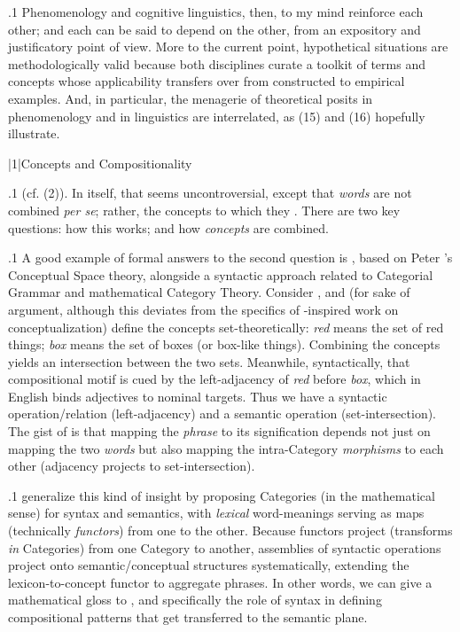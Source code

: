 \documentclass[11pt, twocolumn]{article}
\begin{document}
\p.1{%
\:\+Phenomenology and cognitive linguistics, then, to
my mind reinforce each other; and each can be said
to depend on the other, from an expository
and justificatory point of view. \> More to the current
point, hypothetical situations are methodologically
valid because both disciplines curate a
toolkit of terms and concepts whose
applicability transfers over from constructed
to empirical examples. \> And, in particular, the
menagerie of theoretical posits in
phenomenology and in linguistics are interrelated,
as \exsRef(15) and \exsRef(16) 
hopefully illustrate.\<\; \vspace{6pt}
} %


\s|1|{Concepts and Compositionality }

\p.1{%
\upAdj{2pt}\:\+ (cf. (2)). \>  In itself, that seems uncontroversial,
except that \textit{words} are not combined \textit{per se}; rather,
the concepts to which they . \> There are two
key questions: how this  works; and how
\textit{concepts} are combined.\<\;
} %

\p.1{%
\:\+A good example of formal answers to the second question is
\Boltetal{} , based on Peter \Gardenfors{}'s Conceptual Space
theory, alongside a syntactic approach related to Categorial Grammar
and mathematical Category Theory. \> Consider , and
(for sake of argument, although this deviates from the
specifics of \Gardenfors{}-inspired work on conceptualization)
define the concepts set-theoretically:
\textit{red} means the set of red things; \textit{box} means the set of
boxes (or box-like things). \> Combining the concepts yields
an intersection between the two sets. \> Meanwhile,
syntactically, that compositional motif is cued by the left-adjacency of
\textit{red} before \textit{box}, which in English binds
adjectives to nominal targets. \> Thus we have a
syntactic operation/relation (left-adjacency) and a
semantic operation (set-intersection). \> The gist
of  is that mapping the \textit{phrase} to its signification
depends not just on mapping the two \textit{words} but also
mapping the intra-Category \textit{morphisms} to each other (adjacency
projects to set-intersection).\<\;
} %

\p.1{%
\:\+\Boltetal{} generalize this kind of insight by proposing
Categories (in the mathematical sense) for syntax and semantics,
with \textit{lexical} word-meanings serving as maps (technically
\textit{functors}) from one to the other. \> Because functors
project  (transforms \textit{in} Categories) from one Category
to another, assemblies of syntactic operations
project onto semantic/conceptual structures systematically,
extending the lexicon-to-concept functor to aggregate
phrases. \> In other words, we can give a mathematical gloss
to , and specifically the role of
syntax in defining compositional patterns that get transferred
to the semantic plane.\<\;
} %
\end{document}
